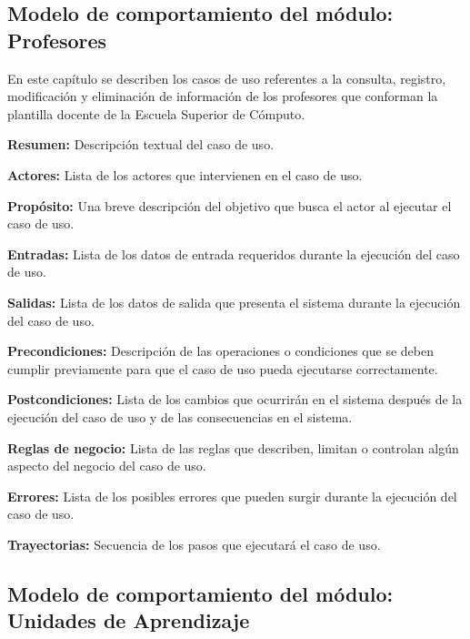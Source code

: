 
\subsection{Modelo de comportamiento del módulo:  Profesores \label{chp:modeloComportamientoProfesores}}

En este capítulo se describen los casos de uso referentes a la consulta, registro, modificación y eliminación de información de los profesores que conforman la plantilla docente de la Escuela Superior de Cómputo. \bigskip

\begin{objetivos}
	\item {\bf Resumen:} Descripción textual del caso de uso.
	\item {\bf Actores:} Lista de los actores que intervienen en el caso de uso.
	\item {\bf Propósito:} Una breve descripción del objetivo que busca el actor al ejecutar el caso de uso.
	\item {\bf Entradas:} Lista de los datos de entrada requeridos durante la ejecución del caso de uso.
	\item {\bf Salidas:} Lista de los datos de salida que presenta el sistema durante la ejecución del caso de uso.
	\item {\bf Precondiciones:} Descripción de las operaciones o condiciones que se deben cumplir previamente para que el caso de uso pueda ejecutarse correctamente.
	\item {\bf Postcondiciones:} Lista de los cambios que ocurrirán en el sistema después de la ejecución del caso de uso y de las consecuencias en el sistema.
	\item {\bf Reglas de negocio:} Lista de las reglas que describen, limitan o controlan algún aspecto del negocio del caso de uso.
	\item {\bf Errores:} Lista de los posibles errores que pueden surgir durante la ejecución del caso de uso.
	\item {\bf Trayectorias:} Secuencia de los pasos que ejecutará el caso de uso.
\end{objetivos}
\subsection{Modelo de comportamiento del módulo: Unidades de Aprendizaje \label{chp:modeloComportamientoUnidadesDeAprendizaje}}

